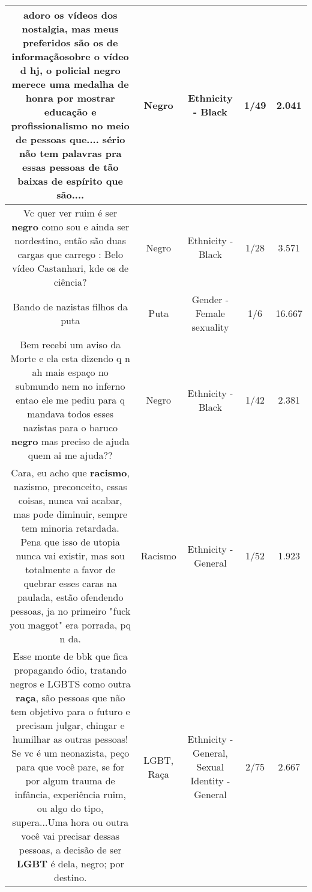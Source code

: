 \documentclass[11pt]{article}
\newlength\mylength
\begin{document}
\begin{center}
\begin{longtable}{|C{.65\mylength}|C{.30\mylength}|C{.12\mylength}|C{.12\mylength}|C{.12\mylength}|}
  \small adoro os vídeos dos nostalgia, mas meus preferidos são os de informaçãosobre o vídeo d hj, o policial \textbf{negro} merece uma medalha de honra por mostrar educação e profissionalismo no meio de pessoas que.... sério não tem palavras pra essas pessoas de tão baixas de espírito que são....\normalsize   & Negro & Ethnicity - Black & 1/49 & 2.041 \\  \hline
  \small Vc quer ver ruim é ser \textbf{negro} como sou e ainda ser nordestino, então são duas cargas que carrego : Belo vídeo Castanhari, kde os de ciência?   \normalsize   & Negro & Ethnicity - Black & 1/28 & 3.571 \\  \hline
  \small Bando de nazistas filhos da puta\normalsize   & Puta & Gender - Female sexuality & 1/6 & 16.667 \\  \hline
  \small Bem recebi um aviso da Morte e ela esta dizendo q n ah mais espaço no submundo nem no inferno entao ele me pediu para q mandava todos esses nazistas para o baruco \textbf{negro} mas preciso de ajuda quem ai me ajuda??\normalsize   & Negro & Ethnicity - Black & 1/42 & 2.381 \\  \hline
  \small Cara, eu acho que \textbf{racismo}, nazismo, preconceito, essas coisas, nunca vai acabar, mas pode diminuir, sempre tem  minoria retardada. Pena que isso de utopia nunca vai existir, mas sou totalmente a favor de quebrar esses caras na paulada, estão ofendendo pessoas, ja no primeiro "fuck you maggot" era porrada, pq n da.\normalsize   & Racismo & Ethnicity - General & 1/52 & 1.923 \\  \hline
  \small Esse monte de bbk que fica propagando ódio, tratando negros e LGBTS como outra \textbf{raça}, são pessoas que não tem objetivo para o futuro e precisam julgar, chingar e humilhar as outras pessoas! Se vc é um neonazista, peço para que você pare, se for por algum trauma de infância, experiência ruim, ou algo do tipo, supera...Uma hora ou outra você vai precisar dessas pessoas, a decisão de ser \textbf{LGBT} é dela, negro; por destino.\normalsize   & LGBT, Raça & Ethnicity - General, Sexual Identity - General & 2/75 & 2.667 \\  \hline

\end{longtable}
\end{center}
\end{document}
